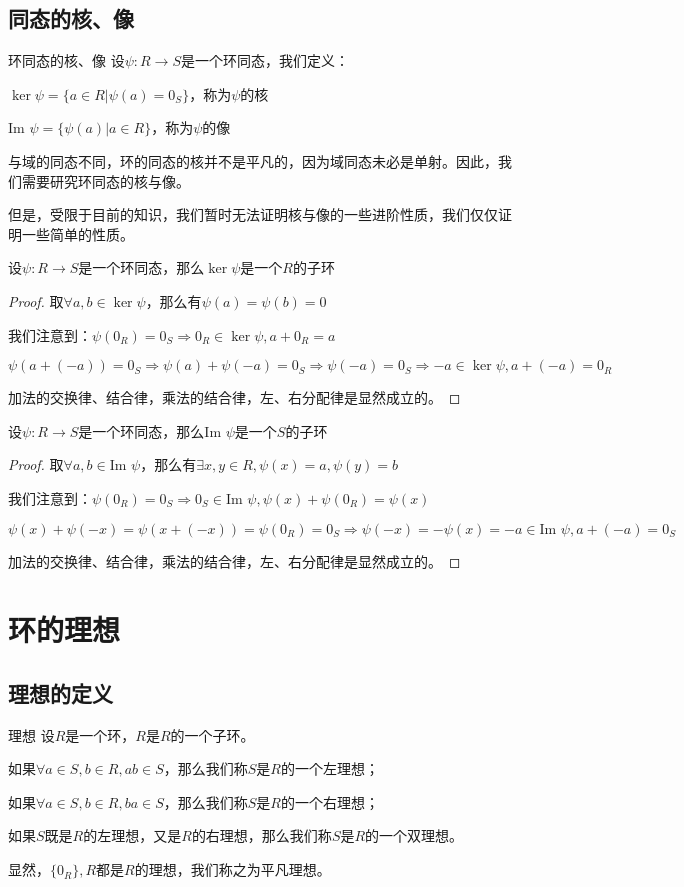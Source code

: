 \documentclass[12pt, a4paper, oneside, UTF8]{ctexbook}
\begin{document}
		\subsection{同态的核、像}
			\begin{defn}{环同态的核、像}{}
				设$\psi : R \rightarrow S$是一个环同态，我们定义：

				$\ker \psi = \{a \in R | \psi (a) = 0_S\}$，称为$\psi $的核

				$\text{Im } \psi = \{\psi (a) | a \in R\}$，称为$\psi $的像
			\end{defn}
			与域的同态不同，环的同态的核并不是平凡的，因为域同态未必是单射。因此，我们需要研究环同态的核与像。

			但是，受限于目前的知识，我们暂时无法证明核与像的一些进阶性质，我们仅仅证明一些简单的性质。
			\begin{proposition}
				设$\psi :R \rightarrow S$是一个环同态，那么$\ker \psi $是一个$R$的子环
			\end{proposition}
			\begin{proof}
				取$\forall a,b \in \ker \psi$，那么有$\psi (a)=\psi (b)=0$

				我们注意到：$\psi (0_R) = 0_S \Rightarrow 0_R \in \ker \psi ,a +0_R=a$

				$\psi \left(a+(-a)\right)=0_S \Rightarrow \psi (a)+\psi (-a)=0_S \Rightarrow \psi (-a)=0_S \Rightarrow -a \in \ker \psi,a+(-a)=0_R$

				加法的交换律、结合律，乘法的结合律，左、右分配律是显然成立的。
			\end{proof}
			\begin{proposition}
				设$\psi :R \rightarrow S$是一个环同态，那么$\text{Im } \psi $是一个$S$的子环
			\end{proposition}
			\begin{proof}
				取$\forall a,b \in \text{Im } \psi$，那么有$\exists x,y \in R,\psi (x)=a,\psi (y)=b$

				我们注意到：$\psi (0_R) = 0_S \Rightarrow 0_S \in \text{Im } \psi ,\psi (x)+\psi (0_R)=\psi (x)$

				$\psi (x)+\psi (-x)=\psi (x+(-x))=\psi (0_R)=0_S \Rightarrow \psi (-x)=-\psi (x)=-a \in \text{Im } \psi ,a+(-a)=0_S$

				加法的交换律、结合律，乘法的结合律，左、右分配律是显然成立的。
			\end{proof}
	\section{环的理想}
		\subsection{理想的定义}
			\begin{defn}{理想}{}
				设$R$是一个环，$R$是$R$的一个子环。

				如果$\forall a \in S,b \in R,ab \in S$，那么我们称$S$是$R$的一个左理想；

				如果$\forall a \in S,b \in R,ba \in S$，那么我们称$S$是$R$的一个右理想；

				如果$S$既是$R$的左理想，又是$R$的右理想，那么我们称$S$是$R$的一个双理想。
			\end{defn}
			显然，$\{0_R\},R$都是$R$的理想，我们称之为平凡理想。
\end{document}
